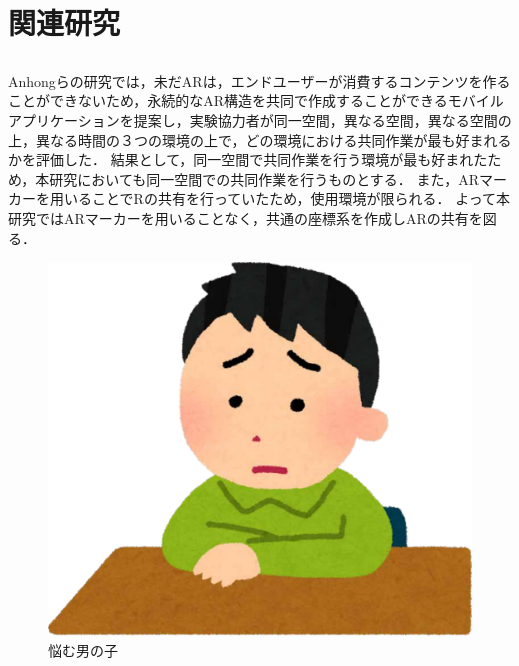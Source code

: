 \documentclass[a4paper,10pt,twocolumn,uplatex]{jsarticle}
\begin{document}
\section{関連研究}
\subsection{}
Anhongらの研究では\cite{collaborative}，未だARは，エンドユーザーが消費するコンテンツを作ることができないため，永続的なAR構造を共同で作成することができるモバイルアプリケーションを提案し，実験協力者が同一空間，異なる空間，異なる空間の上，異なる時間の３つの環境の上で，どの環境における共同作業が最も好まれるかを評価した．
結果として，同一空間で共同作業を行う環境が最も好まれたため，本研究においても同一空間での共同作業を行うものとする．
また，ARマーカーを用いることでRの共有を行っていたため，使用環境が限られる．
よって本研究ではARマーカーを用いることなく，共通の座標系を作成しARの共有を図る．


\begin{figure}[!tb]
  \centering
  \includegraphics[width=\linewidth]{img/sample1.pdf}
  \caption{悩む男の子}
  \label{fig:sample1}
\end{figure}
\end{document}
